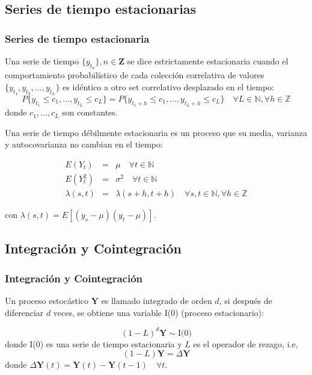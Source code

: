 \documentclass{beamer}
\begin{document}
        \subsection{Series de tiempo estacionarias}
            \begin{frame}
            \frametitle{Series de tiempo estacionaria}
            Una serie de tiempo $\{y_{t_n}\}, n \in \mathbf{Z}$ se dice estrictamente
            estacionaria cuando el comportamiento probabilístico de cada colección
            correlativa de valores $\{y_{t_1},y_{t_2},\dots,y_{t_L}\}$ es idéntico a otro
            set correlativo desplazado en el tiempo:
            \[ P\{y_{t_1} \leq
            c_1,\dots,y_{t_L} \leq c_L\} = P\{y_{t_1+h} \leq c_1,\dots,y_{t_L+h}
            \leq c_L\}
            \quad \forall L \in \mathbb{N}, \forall h \in \mathbb{Z}\] \noindent donde
            $c_1,\dots,c_L$ son constantes.
            \end{frame}

            \begin{frame}
            Una serie de tiempo débilmente estacionaria es un proceso que su media,
            varianza y autocovarianza no cambian en el tiempo:
            
            \begin{eqnarray*}
            E(Y_t) &=& \mu  \quad \forall t \in \mathbb{N} \\ E(Y^2_t) &=&
            \sigma^2  \quad \forall t \in \mathbb{N} \\
            \lambda(s,t)&=&\lambda(s+h,t+h) \quad \forall s,t \in \mathbb{N},
            \forall h \in \mathbb{Z}
            \end{eqnarray*}
            
            \noindent con $\lambda(s,t) = E[(y_s-\mu)(y_t - \mu)]$.

            \end{frame}
        \subsection{Integración y Cointegración}
            \begin{frame}
            \frametitle{Integración y Cointegración} 
            Un proceso estocástico $\mathbf{Y}$ es llamado integrado de orden $d$, si
            después de diferenciar $d$ veces, se obtiene una variable I(0) (proceso
            estacionario):
            
            \[
            (1-L)^d \mathbf{Y} \sim \text{I(0)}
            \]
            \noindent donde I(0) es una serie de tiempo estacionaria y $L$ es el operador de rezago, i.e,
            \[
            (1-L)\mathbf{Y} = \Delta \mathbf{Y}
            \]
            \noindent donde $\Delta \mathbf{Y}(t) = \mathbf{Y}(t)  -\mathbf{Y}(t-1) \quad \forall t $.
            \end{frame}
                      
\end{document}
